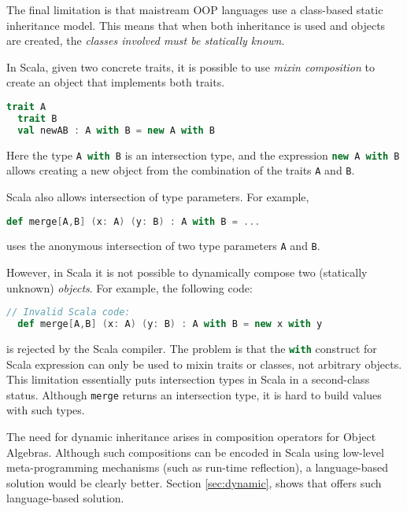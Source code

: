 The final limitation is that maistream OOP languages use a class-based static
inheritance model. This means that when both inheritance is used and objects are
created, the \emph{classes involved must be statically known}.
\begin{comment}
Intersection types date back as early as Coppo et al.'s
work~\cite{coppo1981functional}. Since then researchers have studied
intersection types, and some languages have adopted them in one form or another.

In Java, for example,
\begin{lstlisting}[language=java]
  interface AwithB extends A, B {}
\end{lstlisting}
introduces a new interface \lstinline$AwithB$ that satisfies the interface of
both \lstinline{A} and \lstinline{B}. 
\end{comment}
In Scala, given two concrete traits, it is
possible to use \textit{mixin composition} to create an object that implements
both traits.
\begin{lstlisting}[language=scala]
  trait A
  trait B
  val newAB : A with B = new A with B
\end{lstlisting}
\noindent Here the type \lstinline[language=scala]{A with B} is an intersection type,
and the expression \lstinline[language=scala]{new A with B} allows creating a new
object from the combination of the traits \lstinline{A} and
\lstinline{B}.

Scala also allows intersection of type parameters. For example,
\begin{lstlisting}[language=scala]
  def merge[A,B] (x: A) (y: B) : A with B = ...
\end{lstlisting}
uses the anonymous intersection of two type parameters \lstinline{A} and
\lstinline{B}.

However, in Scala it is not possible to dynamically compose two
(statically unknown) \emph{objects}. For
example, the following code:
\begin{lstlisting}[language=scala]
  // Invalid Scala code:
  def merge[A,B] (x: A) (y: B) : A with B = new x with y
\end{lstlisting}
is rejected by the Scala compiler. The problem is that the \lstinline[language=scala]$with$
construct for Scala expression can only be used to mixin traits or classes, not
arbitrary objects. This limitation essentially puts intersection types in Scala
in a second-class status. Although \lstinline{merge} returns an intersection
type, it is hard to build values with such types. 

The need for dynamic inheritance arises in composition operators for Object
Algebras. Although such compositions can be encoded in Scala using low-level
meta-programming mechanisms (such as run-time reflection), a language-based
solution would be clearly better. Section \ref{sec:dynamic}, shows that \name
offers such language-based solution.
